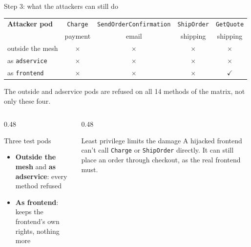 \documentclass[9pt,aspectratio=169]{beamer}
\begin{document}
\begin{frame}{Step 3: what the attackers can still do}
  \newcommand{\yes}{\textcolor{AccentGreen}{\large$\checkmark$}}
  \newcommand{\nope}{\textcolor{MainRed}{\large$\times$}}
  \centering
  {\small
  \begin{tabular}{lcccc}
    \toprule
    \textbf{Attacker pod} & \texttt{Charge} & \texttt{SendOrderConfirmation} & \texttt{ShipOrder} & \texttt{GetQuote} \\
                          & \scriptsize payment & \scriptsize email & \scriptsize shipping & \scriptsize shipping \\
    \midrule
    outside the mesh       & \nope & \nope & \nope & \nope \\
    as \texttt{adservice} & \nope & \nope & \nope & \nope \\
    as \texttt{frontend}  & \nope & \nope & \nope & \yes \\
    \bottomrule
  \end{tabular}}

  \vspace{2pt}
  {\tiny The outside and adservice pods are refused on all 14 methods of the matrix, not only these four.}

  \vspace{8pt}
  \begin{columns}[T,onlytextwidth]
    \begin{column}{0.48\textwidth}
      \begin{block}{Three test pods}
        \begin{itemize}\setlength{\itemsep}{2pt}
          \item \textbf{Outside the mesh} and \textbf{as adservice}: every method refused
          \item \textbf{As frontend}: keeps the frontend's own rights, nothing more
        \end{itemize}
      \end{block}
    \end{column}
    \begin{column}{0.48\textwidth}
      \begin{alertblock}{Least privilege limits the damage}
        A hijacked frontend can't call \texttt{Charge} or \texttt{ShipOrder}
        directly. It can still place an order through checkout, as the real
        frontend must.
      \end{alertblock}
    \end{column}
  \end{columns}
\end{frame}
\end{document}
